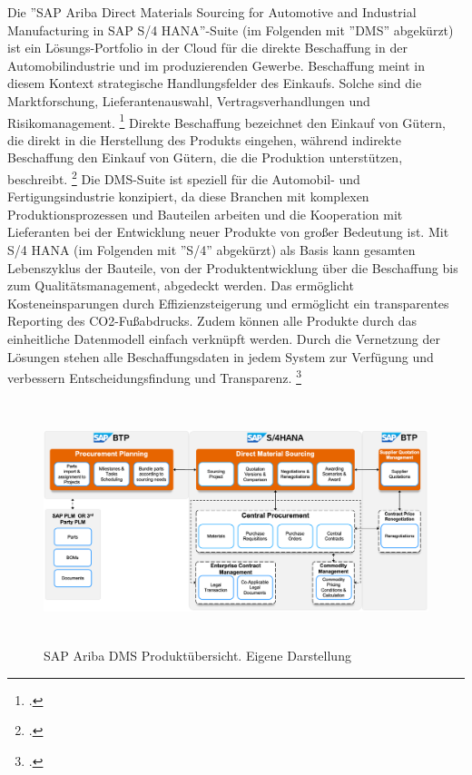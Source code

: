 Die ''SAP Ariba Direct Materials Sourcing for Automotive and Industrial Manufacturing in SAP S/4 HANA''-Suite (im Folgenden mit ''DMS'' abgekürzt) ist ein Lösungs-Portfolio in der Cloud für die direkte Beschaffung in der Automobilindustrie und im produzierenden Gewerbe. Beschaffung meint in diesem Kontext strategische Handlungsfelder des Einkaufs. Solche sind \zB die Marktforschung, Lieferantenauswahl, Vertragsverhandlungen und Risikomanagement. \footcite[Vgl.][S. 541]{theorie_digitale_transformation_beschaffung_automobilindustrie_2019} Direkte Beschaffung bezeichnet den Einkauf von Gütern, die direkt in die Herstellung des Produkts eingehen, während indirekte Beschaffung den Einkauf von Gütern, die die Produktion unterstützen, beschreibt. \footcite[Vgl.][S. 541]{theorie_digitale_transformation_beschaffung_automobilindustrie_2019} Die DMS-Suite ist speziell für die Automobil- und Fertigungsindustrie konzipiert, da diese Branchen mit komplexen Produktionsprozessen und Bauteilen arbeiten und die Kooperation mit Lieferanten bei der Entwicklung neuer Produkte von gro\ss er Bedeutung ist. Mit S/4 HANA (im Folgenden mit ''S/4'' abgekürzt) als Basis kann gesamten Lebenszyklus der Bauteile, von der Produktentwicklung über die Beschaffung bis zum Qualitätsmanagement, abgedeckt werden. Das ermöglicht Kosteneinsparungen durch Effizienzsteigerung und ermöglicht ein transparentes Reporting des CO2-Fu\ss abdrucks. Zudem können alle Produkte durch das einheitliche Datenmodell einfach verknüpft werden. Durch die Vernetzung der Lösungen stehen alle Beschaffungsdaten in jedem System zur Verfügung und verbessern Entscheidungsfindung und Transparenz. \footcite[Vgl.][]{theorie_sap_webseite_dms_übersicht_2024}

\begin{figure}[H]
    \centering
    \includegraphics[height=7.09cm]{Bilder/Direct_Material_Sourcing_Overview3.png}
    \caption[SAP Ariba DMS Suite Produktübersicht]{SAP Ariba DMS Produktübersicht. Eigene Darstellung}
    \label{fig:Direct_Material_Sourcing_Overview3}
\end{figure}

